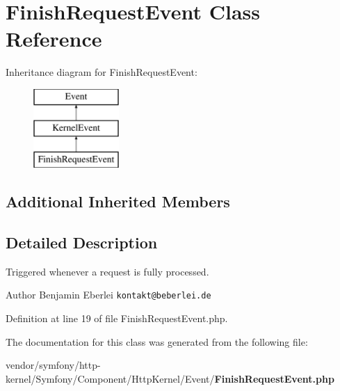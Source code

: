 \section{Finish\+Request\+Event Class Reference}
\label{class_symfony_1_1_component_1_1_http_kernel_1_1_event_1_1_finish_request_event}
Inheritance diagram for Finish\+Request\+Event\+:\begin{figure}[H]
\begin{center}
\leavevmode
\includegraphics[height=3.000000cm]{class_symfony_1_1_component_1_1_http_kernel_1_1_event_1_1_finish_request_event}
\end{center}
\end{figure}
\subsection*{Additional Inherited Members}


\subsection{Detailed Description}
Triggered whenever a request is fully processed.

\begin{DoxyAuthor}{Author}
Benjamin Eberlei {\tt kontakt@beberlei.\+de} 
\end{DoxyAuthor}


Definition at line 19 of file Finish\+Request\+Event.\+php.



The documentation for this class was generated from the following file\+:\begin{DoxyCompactItemize}
\item 
vendor/symfony/http-\/kernel/\+Symfony/\+Component/\+Http\+Kernel/\+Event/{\bf Finish\+Request\+Event.\+php}\end{DoxyCompactItemize}
